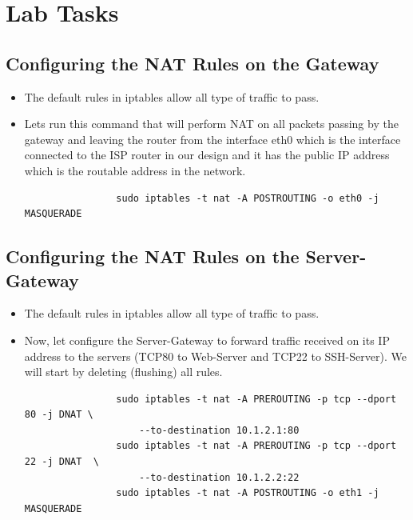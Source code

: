 \section{Lab Tasks}

\subsection{Configuring the NAT Rules on the Gateway}
\begin{itemize}
	\item The default rules in iptables allow all type of traffic to pass.

	\item Lets run this command that will perform NAT on all packets passing by the gateway and leaving the router from the interface eth0 which is the interface connected to the ISP router in our design and it has the public IP address which is the routable address in the network.
		\begin{verbatim}
				sudo iptables -t nat -A POSTROUTING -o eth0 -j MASQUERADE
		\end{verbatim}
\end{itemize}

\subsection{Configuring the NAT Rules on the Server-Gateway}
\begin{itemize}
	\item The default rules in iptables allow all type of traffic to pass.

	\item Now, let configure the Server-Gateway to forward traffic received on its IP address to the servers (TCP80 to Web-Server and TCP22 to SSH-Server). We will start by deleting (flushing) all rules.
		\begin{verbatim}
				sudo iptables -t nat -A PREROUTING -p tcp --dport 80 -j DNAT \
					--to-destination 10.1.2.1:80
				sudo iptables -t nat -A PREROUTING -p tcp --dport 22 -j DNAT  \
					--to-destination 10.1.2.2:22
				sudo iptables -t nat -A POSTROUTING -o eth1 -j MASQUERADE
		\end{verbatim}
\end{itemize}

